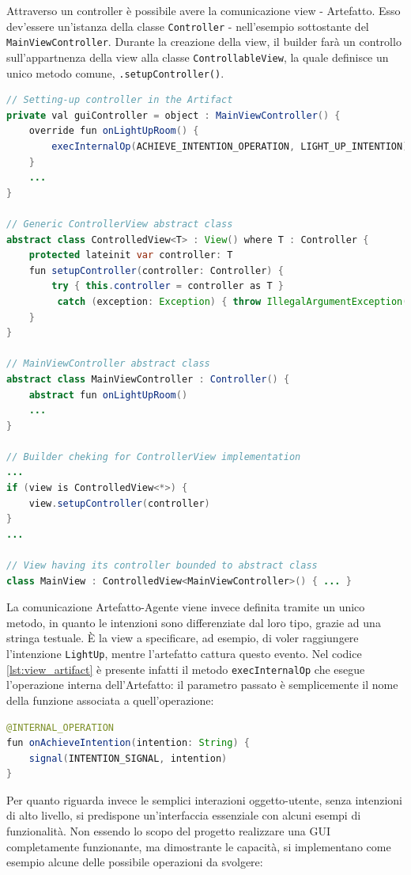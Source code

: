 \documentclass[12pt,a4paper,openright,oneside]{report}
\begin{document}
Attraverso un controller è possibile avere la comunicazione view - Artefatto. Esso dev'essere un'istanza della classe \texttt{Controller} - nell'esempio sottostante del \texttt{MainViewController}. Durante la creazione della view, il builder farà un controllo sull'appartnenza della view alla classe \texttt{ControllableView}, la quale definisce un unico metodo comune, \texttt{.setupController()}.

\begin{lstlisting}[language=Java, label=lst:view_artifact]
// Setting-up controller in the Artifact
private val guiController = object : MainViewController() {
	override fun onLightUpRoom() {
		execInternalOp(ACHIEVE_INTENTION_OPERATION, LIGHT_UP_INTENTION)
	}
	...
}

// Generic ControllerView abstract class
abstract class ControlledView<T> : View() where T : Controller {
	protected lateinit var controller: T
	fun setupController(controller: Controller) {
		try { this.controller = controller as T }
		 catch (exception: Exception) { throw IllegalArgumentException("Controller is not of requested type!") }
	}
}

// MainViewController abstract class
abstract class MainViewController : Controller() {
	abstract fun onLightUpRoom()
	...
}

// Builder cheking for ControllerView implementation
...
if (view is ControlledView<*>) {
	view.setupController(controller)
}
...

// View having its controller bounded to abstract class
class MainView : ControlledView<MainViewController>() { ... }
\end{lstlisting}

La comunicazione Artefatto-Agente viene invece definita tramite un unico metodo, in quanto le intenzioni sono differenziate dal loro tipo, grazie ad una stringa testuale. È la view a specificare, ad esempio, di voler raggiungere l'intenzione \texttt{LightUp}, mentre l'artefatto cattura questo evento. Nel codice \ref{lst:view_artifact} è presente infatti il metodo \texttt{execInternalOp} che esegue l'operazione interna dell'Artefatto: il parametro passato è semplicemente il nome della funzione associata a quell'operazione:

\begin{lstlisting}[language=Java]
@INTERNAL_OPERATION
fun onAchieveIntention(intention: String) {
	signal(INTENTION_SIGNAL, intention)
}
\end{lstlisting}

Per quanto riguarda invece le semplici interazioni oggetto-utente, senza intenzioni di alto livello, si predispone un'interfaccia essenziale con alcuni esempi di funzionalità. Non essendo lo scopo del progetto realizzare una GUI completamente funzionante, ma dimostrante le capacità, si implementano come esempio alcune delle possibile operazioni da svolgere:
\end{document}
